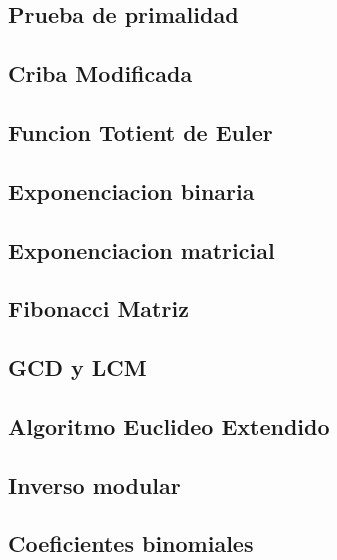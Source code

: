 \subsection{Prueba de primalidad}
\raggedbottom
\hrulefill
\subsection{Criba Modificada}
\raggedbottom
\hrulefill
\subsection{Funcion Totient de Euler}
\raggedbottom
\hrulefill
\subsection{Exponenciacion binaria}
\raggedbottom
\hrulefill
\subsection{Exponenciacion matricial}
\raggedbottom
\hrulefill
\subsection{Fibonacci Matriz}
\raggedbottom
\hrulefill
\subsection{GCD y LCM}
\raggedbottom
\hrulefill
\subsection{Algoritmo Euclideo Extendido}
\raggedbottom
\hrulefill
\subsection{Inverso modular}
\raggedbottom
\hrulefill
\subsection{Coeficientes binomiales}
\raggedbottom
\hrulefill

